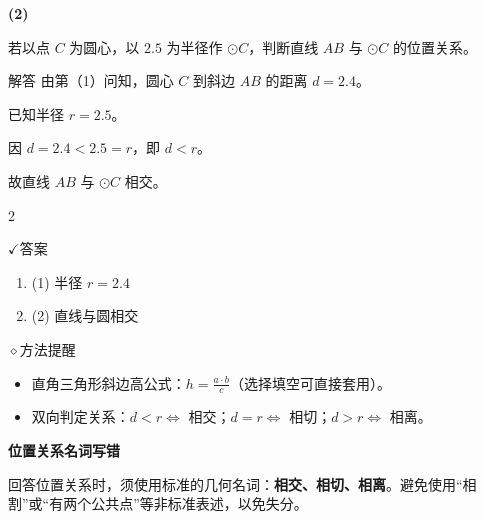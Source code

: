 \documentclass{exam-zh}
\newcommand{\eduSubTitle}[1]{%
  \needspace{4\baselineskip}%
  \vspace{1mm}
  {\color{edu-blue}\bfseries #1}\par
  \vspace{1mm}
}
\newenvironment{eduSubQuestionItem}[1]{%
  \needspace{4\baselineskip}%
  \vspace{2mm}
  \par\noindent
  \hangindent=8mm\hangafter=1
  {\color{edu-blue}\bfseries #1}\enspace
  \begingroup
  \color{edu-ink}
}{%
  \endgroup
  \par
  \vspace{3mm}
}
\newcommand{\eduIconCheck}{\(\checkmark\)}
\newcommand{\eduIconPin}{\(\diamond\)}
\newenvironment{eduBulletList}{%
  \begin{itemize}[
    label=\textbullet,
    leftmargin=5mm,
    itemsep=1.2mm,
    topsep=0pt,
    parsep=0pt
  ]
}{%
  \end{itemize}
}
\newenvironment{eduBottomGrid}{%
  \columnratio{0.32, 0.68}%
  \setlength{\columnsep}{11mm}%
  \columnseprule=0pt%
  \begin{paracol}{2}%
}{%
  \end{paracol}%
}
\newenvironment{eduSummaryLeft}{%
}{%
}
\newcommand{\eduSummaryDivider}{%
  \switchcolumn
}
\newenvironment{eduSummaryRight}{%
}{%
}
\newenvironment{eduPlainList}{%
  \begin{enumerate}[
    label=(\arabic*),
    leftmargin=7mm,
    itemsep=1.2mm,
    topsep=0pt,
    parsep=0pt
  ]
}{%
  \end{enumerate}
}
\begin{document}
\begin{eduSubQuestionItem}{(2)}
若以点 $C$ 为圆心，以 $2.5$ 为半径作 $\odot C$，判断直线 $AB$ 与 $\odot C$ 的位置关系。\end{eduSubQuestionItem}

\begin{eduSolutionBox}{解答}
  \begingroup
  \setlength{\parskip}{2.5mm}
由第（1）问知，圆心 $C$ 到斜边 $AB$ 的距离 $d = 2.4$。\par
已知半径 $r = 2.5$。\par
因 $d = 2.4 < 2.5 = r$，即 $d < r$。\par
故直线 $AB$ 与 $\odot C$ 相交。\par
  \endgroup
\end{eduSolutionBox}




\begin{eduBottomGrid}
  \begin{eduSummaryLeft}
    \begin{eduSummaryBlock}{\eduIconCheck}{答案}
    \begin{eduPlainList}
      \item (1) 半径 $r = 2.4$      \item (2) 直线与圆相交    \end{eduPlainList}
    \end{eduSummaryBlock}
  \end{eduSummaryLeft}
  \eduSummaryDivider
  \begin{eduSummaryRight}
    \begin{eduSummaryBlock}{\eduIconPin}{方法提醒}
    \begin{eduBulletList}
      \item 直角三角形斜边高公式：$h = \frac{a \cdot b}{c}$（选择填空可直接套用）。      \item 双向判定关系：$d < r \iff$ 相交；$d = r \iff$ 相切；$d > r \iff$ 相离。    \end{eduBulletList}
    \end{eduSummaryBlock}
  \end{eduSummaryRight}
\end{eduBottomGrid}




\begin{eduMistakeBox}
\eduSubTitle{位置关系名词写错}回答位置关系时，须使用标准的几何名词：\textbf{相交、相切、相离}。避免使用“相割”或“有两个公共点”等非标准表述，以免失分。
\end{eduMistakeBox}
\end{document}
